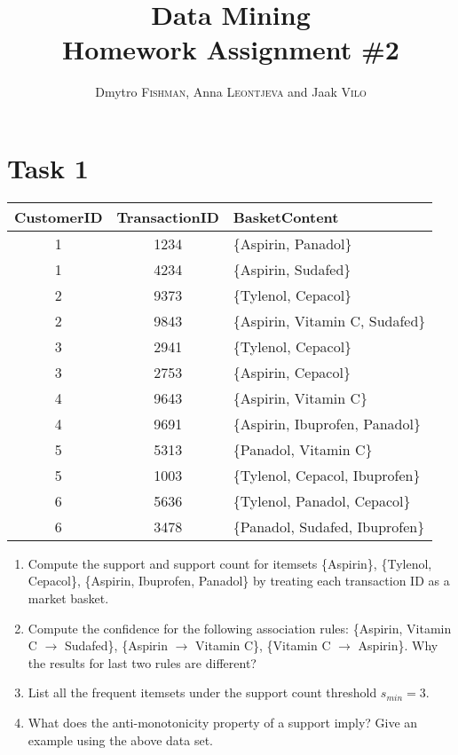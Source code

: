 \documentclass{article}
\title{Data Mining\\Homework Assignment \#2} %
\author{Dmytro \textsc{Fishman}, Anna \textsc{Leontjeva} and Jaak \textsc{Vilo}} %
\begin{document}
\maketitle %
\section*{Task 1}
\begin{center}
    \begin{tabular}{| c | c | l|}
    \hline
    CustomerID & TransactionID& BasketContent \\ \hline
    	1 & 1234 & \{Aspirin, Panadol\}\\ \hline
    	1 & 4234 & \{Aspirin, Sudafed\}\\ \hline
    	2 & 9373& \{Tylenol, Cepacol\}\\ \hline
	2 & 9843& \{Aspirin, Vitamin C, Sudafed\}\\ \hline 
	3 & 2941& \{Tylenol, Cepacol\}\\ \hline  
	3 & 2753& \{Aspirin, Cepacol\}\\ \hline
	4 & 9643& \{Aspirin, Vitamin C\}\\ \hline
	4 & 9691& \{Aspirin, Ibuprofen, Panadol\}\\ \hline
	5 & 5313& \{Panadol, Vitamin C\}\\ \hline
	5 & 1003& \{Tylenol, Cepacol, Ibuprofen\}\\ \hline
	6 & 5636& \{Tylenol, Panadol, Cepacol\}\\ \hline
	6 & 3478& \{Panadol, Sudafed, Ibuprofen\}\\ \hline
 \end{tabular}
\end{center}
\begin{enumerate}
\item Compute the support and support count for itemsets \{Aspirin\}, \{Tylenol, Cepacol\}, \{Aspirin, Ibuprofen, Panadol\} by treating each transaction ID as a market basket.
\item Compute the confidence for the following association rules: \{Aspirin, Vitamin C $\rightarrow$ Sudafed\}, \{Aspirin $\rightarrow$ Vitamin C\}, \{Vitamin C $\rightarrow$ Aspirin\}. Why the results for last two rules are different?
\item List all the frequent itemsets under the support count threshold $s_{min} = 3$.
\item What does the anti-monotonicity property of a support imply? Give an example using the above data set. 
\end{enumerate}
\end{document}
